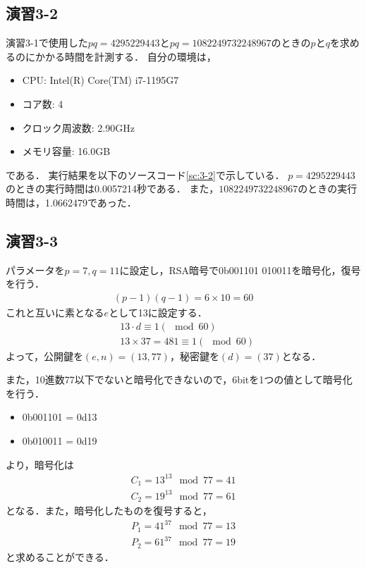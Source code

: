 \documentclass[documentclass]{jsarticle}
\begin{document}




\subsection*{演習3-2}
演習3-1で使用した$pq = 4295229443$と$pq = 1082249732248967$のときの$p$と$q$を求めるのにかかる時間を計測する．
自分の環境は，
\begin{itemize}
  \item CPU: Intel(R) Core(TM) i7-1195G7
  \item コア数: 4
  \item クロック周波数: 2.90GHz
  \item メモリ容量: 16.0GB
\end{itemize}
である．
実行結果を以下のソースコード\ref*{sc:3-2}で示している．
$p=4295229443$のときの実行時間は0.0057214秒である．
また，$1082249732248967$のときの実行時間は，1.0662479であった．



\subsection*{演習3-3}
パラメータを$p=7, q=11$に設定し，RSA暗号で0b001101 010011を暗号化，復号を行う．
\begin{align}
  (p-1)(q-1) = 6 \times 10 = 60
\end{align}
これと互いに素となる$e$として13に設定する．
\begin{align}
&13 \cdot d \equiv 1(\mod60)\\
&13 \times 37 = 481 \equiv 1(\mod60)
\end{align}
よって，公開鍵を$(e,n)=(13,77)$，秘密鍵を$(d)=(37)$となる．

また，10進数77以下でないと暗号化できないので，6bitを1つの値として暗号化を行う．
\begin{itemize}
  \item 0b001101 = 0d13
  \item 0b010011 = 0d19
\end{itemize}
より，暗号化は
\begin{align}
  C_1 = 13^{13} \mod 77 = 41\\
  C_2 = 19^{13} \mod 77 = 61
\end{align}
となる．また，暗号化したものを復号すると，
\begin{align}
  P_1 = 41^{37} \mod 77 = 13\\
  P_2 = 61^{37} \mod 77 = 19
\end{align}
と求めることができる．



\end{document}
